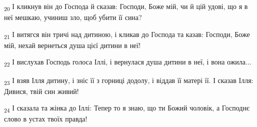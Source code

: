 \begin{tcolorbox}
\textsubscript{20} І кликнув він до Господа й сказав: Господи, Боже мій, чи й цій удові, що я в неї мешкаю, учиниш зло, щоб убити її сина?
\end{tcolorbox}
\begin{tcolorbox}
\textsubscript{21} І витягся він тричі над дитиною, і кликав до Господа та казав: Господи, Боже мій, нехай вернеться душа цієї дитини в неї!
\end{tcolorbox}
\begin{tcolorbox}
\textsubscript{22} І вислухав Господь голоса Іллі, і вернулася душа дитини в неї, і вона ожила...
\end{tcolorbox}
\begin{tcolorbox}
\textsubscript{23} І взяв Ілля дитину, і зніс її з горниці додолу, і віддав її матері її. І сказав Ілля: Дивися, твій син живий!
\end{tcolorbox}
\begin{tcolorbox}
\textsubscript{24} І сказала та жінка до Іллі: Тепер то я знаю, що ти Божий чоловік, а Господнє слово в устах твоїх правда!
\end{tcolorbox}
